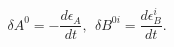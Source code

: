 \begin{equation}
\delta A^0 = -\frac{d\epsilon_A}{dt}, ~~ \delta
B^{0i}=\frac{d\epsilon^i_B}{dt}.
\end{equation}


